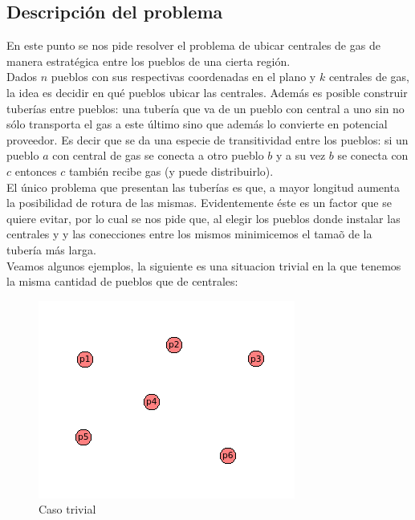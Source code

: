 \subsection{Descripci\'on del problema}

En este punto se nos pide resolver el problema de ubicar centrales de gas de manera estrat\'egica entre los pueblos de una cierta regi\'on.\\

Dados $n$ pueblos con sus respectivas coordenadas en el plano y $k$ centrales de gas, la idea es decidir en qu\'e pueblos ubicar las centrales. Adem\'as es posible construir tuber\'ias entre pueblos: una tuber\'ia que va de un pueblo con central a uno sin no s\'olo transporta el gas a este \'ultimo sino que adem\'as lo convierte en potencial proveedor. Es decir que se da una especie de transitividad entre los pueblos: si un pueblo $a$ con central de gas se conecta a otro pueblo $b$ y a su vez $b$ se conecta con $c$ entonces $c$ tambi\'en recibe gas (y puede distribuirlo).\\

El \'unico problema que presentan las tuber\'ias es que, a mayor longitud aumenta la posibilidad de rotura de las mismas. Evidentemente \'este es un factor que se quiere evitar, por lo cual se nos pide que, al elegir los pueblos donde instalar las centrales y y las conecciones entre los mismos minimicemos el tama\~o de la tuber\'ia m\'as larga.\\

Veamos algunos ejemplos, la siguiente es una situacion trivial en la que tenemos la misma cantidad de pueblos que de centrales:

\begin{figure}[h]
\begin{center}
\includegraphics[scale=0.7]{./img/ej2_explicacion1.png}
\caption{Caso trivial}
\end{center}
\end{figure}

